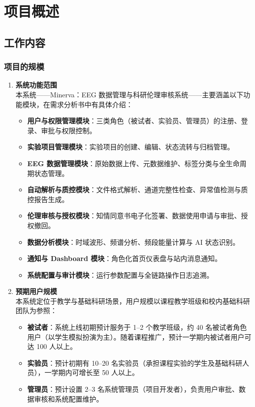 \section{项目概述}

\subsection{工作内容}

\subsubsection{项目的规模}

\begin{enumerate}[(1)]
  \item \textbf{系统功能范围}\\
  本系统——Minerva：EEG 数据管理与科研伦理审核系统——主要涵盖以下功能模块，在需求分析书中有具体介绍：
    \begin{itemize}
      \item \textbf{用户与权限管理模块}：三类角色（被试者、实验员、管理员）的注册、登录、审批与权限控制。
      \item \textbf{实验项目管理模块}：实验项目的创建、编辑、状态流转与归档管理。
      \item \textbf{EEG 数据管理模块}：原始数据上传、元数据维护、标签分类与全生命周期状态管理。
      \item \textbf{自动解析与质控模块}：文件格式解析、通道完整性检查、异常值检测与质控报告生成。
      \item \textbf{伦理审核与授权模块}：知情同意书电子化签署、数据使用申请与审批、授权撤回。
      \item \textbf{数据分析模块}：时域波形、频谱分析、频段能量计算与 AI 状态识别。
      \item \textbf{通知与 Dashboard 模块}：角色化首页仪表盘与站内消息通知。
      \item \textbf{系统配置与审计模块}：运行参数配置与全链路操作日志追溯。
    \end{itemize}

  \item \textbf{预期用户规模}\\
  本系统定位于教学与基础科研场景，用户规模以课程教学班级和校内基础科研团队为参照：
    \begin{itemize}
      \item \textbf{被试者}：系统上线初期预计服务于 1--2 个教学班级，约 40 名被试者角色用户（以学生模拟扮演为主）。随着课程推广，预计一学期内被试者用户可达 100 人以上。
      \item \textbf{实验员}：预计初期有 10--20 名实验员（承担课程实验的学生及基础科研人员），一学期内可增长至 50 人以上。
      \item \textbf{管理员}：预计设置 2--3 名系统管理员（项目开发者），负责用户审批、数据审核和系统配置维护。
    \end{itemize}


\end{enumerate}
